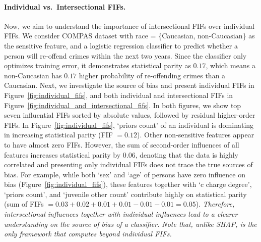 \paragraph{Individual vs.\ Intersectional FIFs.} Now, we aim to understand the importance of intersectional FIFs over individual FIFs. We consider COMPAS dataset with race = \{Caucasian, non-Caucasian\} as the sensitive feature, and a logistic regression classifier to predict whether a person will re-offend crimes within the next two years. Since the classifier only optimizes training error, it demonstrates statistical parity as $ 0.17 $, which means a non-Caucasian  has $ 0.17 $ higher probability of re-offending crimes than a Caucasian. Next, we investigate the source of bias and present individual FIFs in Figure~\ref{fig:individual_fifs}, and both individual and intersectional FIFs in Figure~\ref{fig:individual_and_intersectional_fifs}. In both figures, we show top seven influential FIFs sorted by absolute values,  followed by residual higher-order FIFs. In Figure~\ref{fig:individual_fifs}, `priors count' of an individual is dominating in increasing statistical parity (FIF $ = 0.12 $). Other non-sensitive features appear to have almost zero FIFs. However, the sum of second-order influences of all features increases statistical parity by $ 0.06 $, denoting that the data is highly correlated and presenting only individual FIFs does not trace the true sources of bias. For example, while both `sex' and `age' of persons have zero influence on bias (Figure~\ref{fig:individual_fifs}), these features together with `c charge degree', `priors count', and `juvenile other count' contribute highly on statistical parity (sum of FIFs $ = 0.03 + 0.02 + 0.01 + 0.01 - 0.01 - 0.01 = 0.05$). \emph{Therefore, intersectional influences together with individual influences lead to a clearer understanding on the source of bias of a classifier. Note that, unlike SHAP, {\fairXplainer} is the only framework that computes beyond individual FIFs.}

